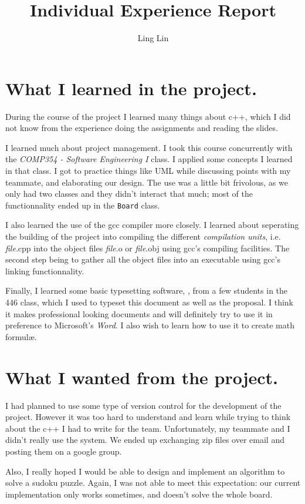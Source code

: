 \documentclass[12pt]{article}
\author{Ling Lin}
\title{Individual Experience Report}
\begin{document}
\maketitle

\section{What I learned in the project.}
During the course of the project I learned many things about c++, which I did
not know from the experience doing the assignments and reading the slides.


I learned much about project management.  I took this course concurrently with
the \emph{COMP354 - Software Engineering I} class.  I applied some concepts I
learned in that class.  I got to practice things like UML while discussing
points with my teammate, and elaborating our design.  The use was a little bit
frivolous, as we only had two classes and they didn't interact that much; most
of the functionnality ended up in the \texttt{Board} class.

I also learned the use of the gcc compiler more closely.  I learned about
seperating the building of the project into compiling the different
\emph{compilation units}, i.e. \textit{file}.cpp into the object files
\textit{file}.o or \textit{file}.obj using gcc's compiling facilities.  The
second step being to gather all the object files into an executable using gcc's
linking functionnality.

Finally, I learned some basic typesetting software, \LaTeXe, from a few
students in the 446 class, which I used to typeset this document as well as the
proposal.  I think it makes professional looking documents and will definitely
try to use it in preference to Microsoft's \emph{Word}. I also wish to learn
how to use it to create math formul\ae.

\section{What I wanted from the project.}
I had planned to use some type of version control for the development of the
project.  However it was too hard to understand and learn while trying to think
about the c++ I had to write for the team.  Unfortunately, my teammate and I
didn't really use the system.  We ended up exchanging zip files over email and
posting them on a google group.

Also, I really hoped I would be able to design and implement an algorithm to
solve a sudoku puzzle.  Again, I was not able to meet this expectation: our
current implementation only works sometimes, and doesn't solve the whole board.
\end{document}

